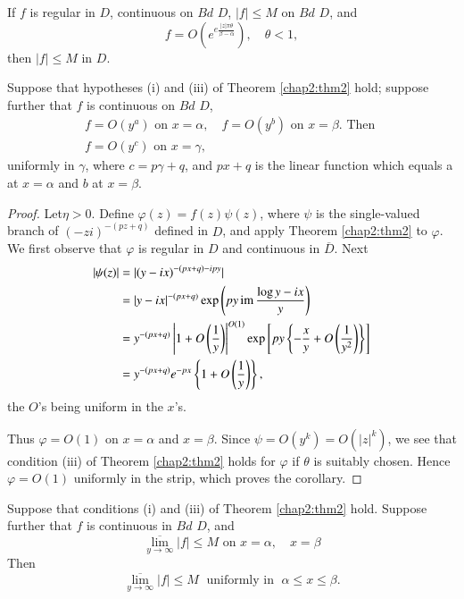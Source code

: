 \begin{corollary}\label{chap2:coro1}
If $f$ is regular in $D$, continuous on $Bd$ $D$, $|f|\leq M$ on $Bd$
$D$, and 
$$
f = O \left(e^{e \frac{|z| \pi \theta}{\beta - \alpha}} \right), \quad
\theta < 1,
$$
then $|f|  \leq M$ in $D$.
\end{corollary}

\begin{corollary}\label{chap2:coro2}
Suppose that hypotheses (i) and (iii) of Theorem \ref{chap2:thm2} hold; suppose
further that $f$ is continuous on $Bd$ $D$,
\begin{gather*}
f = O(y^a) \text{ on } x = \alpha, \quad f = O (y^b) \text{ on } x =
\beta. \text{ Then }\\
f = O (y^c) \text{ on } x = \gamma,
\end{gather*}
uniformly in $\gamma$, where $c = p \gamma + q$, and $px + q$ is the
linear function which equals a at $x = \alpha$ and $b$ at $x =
\beta$.
\end{corollary}

\begin{proof}
Let\pageoriginale $\eta >0$. Define $\varphi (z) = f (z) \psi (z)$,
where $\psi$ is the single-valued branch of $(-zi)^{-(pz+q)}$ defined
in $D$, and apply Theorem \ref{chap2:thm2} to $\varphi$. We first observe that
$\varphi$ is regular in $D$ and continuous in $\overline{D}$. Next
\begin{align*}
|\psi(z)| & = |(y - ix)^{-(px + q) - ipy}|\\
& = |y - ix|^{-(px + q)} \exp \left(py \operatorname{im} \frac{\log y - ix}{y}\right)\\
& = y^{-(px + q)} \left|1 + O \left( \frac{1}{y}\right)\right|^{O(1)} \exp
\left[py \left\{ -\frac{x}{y} + O \left(\frac{1}{y^2} \right) \right\}
\right]\\
& = y^{-(px + q)} e^{-px} \left\{1+O \left(\frac{1}{y} \right)\right\},
\end{align*}
the $O$'s being uniform in the $x$'s.

Thus $\varphi = O(1)$ on $x = \alpha$ and $x = \beta$. Since $\psi = O
(y^k) = O (|z|^k)$, we see that condition (iii) of Theorem \ref{chap2:thm2} holds for
$\varphi$ if $\theta$ is suitably chosen. Hence $\varphi = O(1)$
uniformly in the strip, which proves the corollary.
\end{proof}

\begin{thm}\cite[p.108]{key12}\label{chap2:thm3}
Suppose that conditions (i) and (iii) of Theorem \ref{chap2:thm2} hold. Suppose
further that $f$ is continuous in $Bd$ $D$, and 
$$
\overline{\lim\limits_{y \to \infty}} |f| \leq M \text{ on } x =
\alpha, \quad x = \beta 
$$
Then
$$
\overline{\lim\limits_{y \to \infty}} |f| \leq M \; \text{ uniformly in } \; 
\alpha \leq x \leq \beta.
$$ 
\end{thm}

